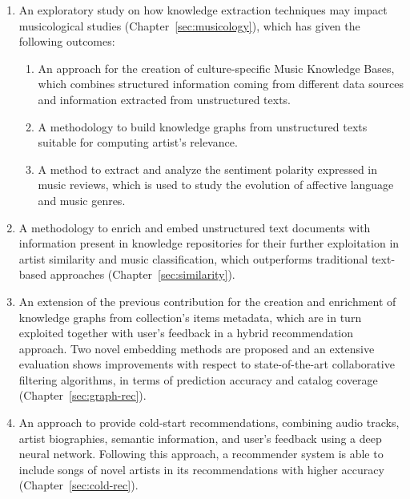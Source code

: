 \begin{enumerate}
\item 
An exploratory study on how knowledge extraction techniques may impact musicological studies (Chapter~\ref{sec:musicology}), which has given the following outcomes:
\begin{enumerate}
\item 
An approach for the creation of culture-specific Music Knowledge Bases, which combines structured information coming from different data sources and information extracted from unstructured texts. 
\item
A methodology to build knowledge graphs from unstructured texts suitable for computing artist's relevance.
\item 
A method to extract and analyze the sentiment polarity expressed in music reviews, which is used to study the evolution of affective language and music genres.
\end{enumerate}

\item 
A methodology to enrich and embed unstructured text documents with information present in knowledge repositories for their further exploitation in artist similarity and music classification, which outperforms traditional text-based approaches (Chapter~\ref{sec:similarity}).

\item
An extension of the previous contribution for the creation and enrichment of knowledge graphs from collection's items metadata, which are in turn exploited together with user's feedback in a hybrid recommendation approach. Two novel embedding methods are proposed and an extensive evaluation shows improvements with respect to state-of-the-art collaborative filtering algorithms, in terms of prediction accuracy and catalog coverage (Chapter~\ref{sec:graph-rec}).%

\item 
An approach to provide cold-start recommendations, combining audio tracks, artist biographies, semantic information, and user's feedback using a deep neural network. Following this approach, a recommender system is able to include songs of novel artists in its recommendations with higher accuracy (Chapter~\ref{sec:cold-rec}).


\end{enumerate}
